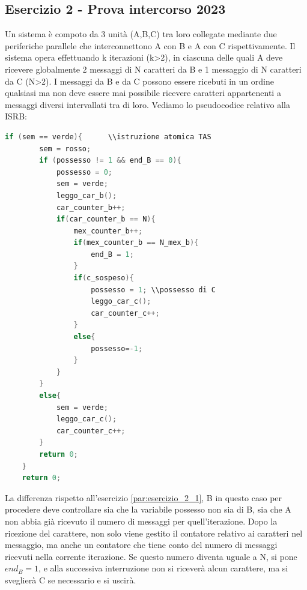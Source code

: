 \subsection{Esercizio 2 - Prova intercorso 2023}
Un sistema è compoto da 3 unità (A,B,C) tra loro collegate mediante due periferiche parallele che interconnettono A con B e A con C rispettivamente. Il sistema opera effettuando k iterazioni (k>2), in ciascuna delle quali A deve ricevere globalmente 2 messaggi di N caratteri da B e 1 messaggio di N caratteri da C (N>2). I messaggi da B e da C possono essere ricebuti in un ordine qualsiasi ma non deve essere mai possibile ricevere caratteri appartenenti a messaggi diversi intervallati tra di loro.
Vediamo lo pseudocodice relativo alla ISRB:

\begin{lstlisting}[language=C]
    if (sem == verde){      \\istruzione atomica TAS
        sem = rosso;
        if (possesso != 1 && end_B == 0){ 
            possesso = 0;
            sem = verde;
            leggo_car_b();
            car_counter_b++;
            if(car_counter_b == N){
                mex_counter_b++;
                if(mex_counter_b == N_mex_b){
                    end_B = 1;
                }
                if(c_sospeso){
                    possesso = 1; \\possesso di C
                    leggo_car_c();
                    car_counter_c++;
                }
                else{
                    possesso=-1;
                }
            }
        }
        else{
            sem = verde;
            leggo_car_c();
            car_counter_c++;
        }
        return 0;
    }
    return 0;
\end{lstlisting}

La differenza rispetto all'esercizio \ref{par:esercizio_2_1}, B in questo caso per procedere deve controllare sia che la variabile possesso non sia di B, sia che A non abbia già ricevuto il numero di messaggi per quell'iterazione. Dopo la ricezione del carattere, non solo viene gestito il contatore relativo ai caratteri nel messaggio, ma anche un contatore che tiene conto del numero di messaggi ricevuti nella corrente iterazione. Se questo numero diventa uguale a N, si pone $end_B = 1$, e alla successiva interruzione non si riceverà alcun carattere, ma si sveglierà C se necessario e si uscirà. 
